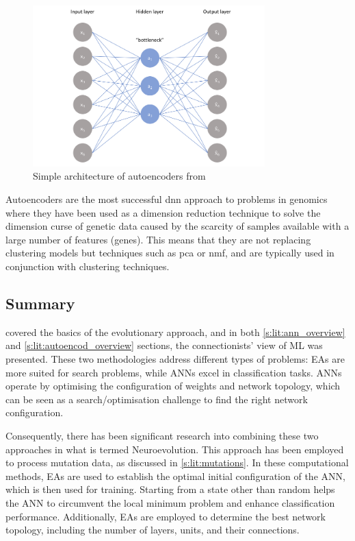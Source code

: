 \begin{figure}[!htb]
  \centering\includegraphics[width=0.8\textwidth,height=0.5\textheight,keepaspectratio]{Sections/Lit_review/Resources/simple_autoencoders.png}
    \caption{Simple architecture of autoencoders from \cite{Jordan2018-bc}}
    \label{fig:autoencoders}
\end{figure}
\FloatBarrier

Autoencoders are the most successful \acrshort{dnn} approach to problems in genomics where they have been used as a dimension reduction technique to solve the dimension curse of genetic data caused by the scarcity of samples available with a large number of features (genes). This means that they are not replacing clustering models but techniques such as \acrfull{pca} or \acrfull{nmf}, and are typically used in conjunction with clustering techniques.


\subsection{Summary} \label{s:lit:choosing_ml}

 covered the basics of the evolutionary approach, and in both \ref{s:lit:ann_overview} and \ref{s:lit:autoencod_overview} sections, the connectionists' view of ML was presented. These two methodologies address different types of problems: EAs are more suited for search problems, while ANNs excel in classification tasks. ANNs operate by optimising the configuration of weights and network topology, which can be seen as a search/optimisation challenge to find the right network configuration. 

Consequently, there has been significant research into combining these two approaches in what is termed Neuroevolution. This approach has been employed to process mutation data, as discussed in \cref{s:lit:mutations}. In these computational methods, EAs are used to establish the optimal initial configuration of the ANN, which is then used for training. Starting from a state other than random helps the ANN to circumvent the local minimum problem and enhance classification performance. Additionally, EAs are employed to determine the best network topology, including the number of layers, units, and their connections.

